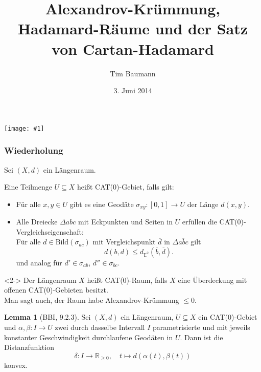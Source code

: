 \documentclass{beamer}
\title{Alexandrov-Krümmung, Hadamard-Räume und der Satz von Cartan-Hadamard}
\author{Tim Baumann}
\institute{Seminar Metrische Geometrie}
\date{3. Juni 2014}
\newcommand{\E}{\mathbb{E}} %
\newcommand{\R}{\mathbb{R}} %
\newcommand{\I}{\left[0,1\right]} %
\newcommand{\Bild}{\mathrm{Bild}} %
\renewcommand{\emph}[1]{\textcolor{Emph}{#1}}
\theoremstyle{definition}
\newtheorem*{lem}{Lemma}
\newcommand{\framedgraphic}[1] {
  \begin{frame}
    \begin{center}
      \vspace{-10pt}
      \texttt{[image: \#1]}
    \end{center}
  \end{frame}
}
\begin{document}
\setlength{\abovedisplayskip}{2pt}
\setlength{\belowdisplayskip}{2pt}
\setlength{\abovedisplayshortskip}{2pt}
\setlength{\belowdisplayshortskip}{2pt}

\begin{frame}[plain]
  \titlepage
\end{frame}

\framedgraphic{bilder/Picture15.jpg}

\begin{frame}
  \frametitle{Wiederholung}

  Sei $(X, d)$ ein Längenraum.

  \begin{definition}
    Eine Teilmenge $U \subseteq X$ heißt \emph{CAT($0$)-Gebiet}, falls gilt:
    \begin{itemize}
      \item Für alle $x, y \in U$ gibt es eine Geodäte $\sigma_{xy} : \I \to U$ der Länge $d(x, y)$.
      \item Alle Dreiecke $\Delta abc$ mit Eckpunkten und Seiten in $U$ erfüllen die CAT($0$)-Vergleichseigenschaft:\\
      Für alle $d \in \Bild(\sigma_{ac})$ mit Vergleichspunkt $\overline{d}$ in $\Delta \overline{abc}$ gilt
      \[ d(b, d) \leq d_{\E^2}(\overline{b}, \overline{d}). \]
      und analog für $d' \in \sigma_{ab}$, $d'' \in \sigma_{bc}$.
    \end{itemize}
  \end{definition}

  \begin{definition}<2->
    Der Längenraum $X$ heißt \emph{CAT($0$)-Raum}, falls $X$ eine Überdeckung mit offenen CAT($0$)-Gebieten besitzt.\\
    Man sagt auch, der Raum habe \emph{Alexandrov-Krümmung $\leq 0$}.
  \end{definition}
\end{frame}

\begin{frame}
  \begin{lem}[BBI, 9.2.3]
    Sei $(X, d)$ ein Längenraum, $U \subseteq X$ ein CAT($0$)-Gebiet und $\alpha, \beta : I \to U$ zwei durch dasselbe Intervall $I$ parametrisierte und mit jeweils konstanter Geschwindigkeit durchlaufene Geodäten in $U$. Dann ist die Distanzfunktion
    \[ \delta : I \to \R_{\geq 0}, \quad t \mapsto d(\alpha(t), \beta(t)) \]
    konvex.
  \end{lem}
\end{frame}
\end{document}
